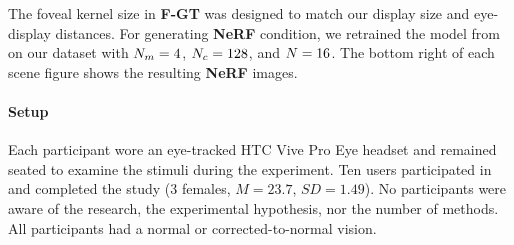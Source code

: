 The foveal kernel size in {\bf F-GT} was designed to match our display size and eye-display distances.
For generating {\bf NeRF} condition, we retrained the model from \cite{mildenhall2020nerf} on our dataset with $N_{m}=4$, $N_{c}=128$, and $N = 16$. The bottom right of each scene figure  shows the resulting {\bf NeRF} images. 


\paragraph{Setup}
Each participant wore an eye-tracked HTC Vive Pro Eye headset and remained seated to examine the stimuli during the experiment.
Ten users participated in and completed the study (3 females, $M=23.7$, $SD=1.49$). 
No participants were aware of the research, the experimental hypothesis, nor the number of methods. All participants had a normal or corrected-to-normal vision.

